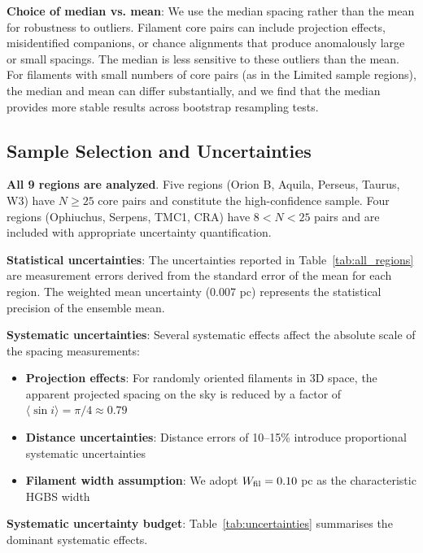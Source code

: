 \documentclass[11pt,a4paper]{article}
\begin{document}
\textbf{Choice of median vs. mean}: We use the median spacing rather than the mean for robustness to outliers. Filament core pairs can include projection effects, misidentified companions, or chance alignments that produce anomalously large or small spacings. The median is less sensitive to these outliers than the mean. For filaments with small numbers of core pairs (as in the Limited sample regions), the median and mean can differ substantially, and we find that the median provides more stable results across bootstrap resampling tests.

\subsection{Sample Selection and Uncertainties}

\textbf{All 9 regions are analyzed}. Five regions (Orion B, Aquila, Perseus, Taurus, W3) have $N \geq 25$ core pairs and constitute the high-confidence sample. Four regions (Ophiuchus, Serpens, TMC1, CRA) have $8 < N < 25$ pairs and are included with appropriate uncertainty quantification.

\textbf{Statistical uncertainties}: The uncertainties reported in Table~\ref{tab:all_regions} are measurement errors derived from the standard error of the mean for each region. The weighted mean uncertainty (0.007 pc) represents the statistical precision of the ensemble mean.

\textbf{Systematic uncertainties}: Several systematic effects affect the absolute scale of the spacing measurements:
\begin{itemize}
    \item \textbf{Projection effects}: For randomly oriented filaments in 3D space, the apparent projected spacing on the sky is reduced by a factor of $\langle \sin i \rangle = \pi/4 \approx 0.79$
    \item \textbf{Distance uncertainties}: Distance errors of 10--15\% introduce proportional systematic uncertainties
    \item \textbf{Filament width assumption}: We adopt $W_{\rm fil} = 0.10$ pc as the characteristic HGBS width \citep{Arzoumanian2011}
\end{itemize}

\textbf{Systematic uncertainty budget}: Table~\ref{tab:uncertainties} summarises the dominant systematic effects.
\end{document}
